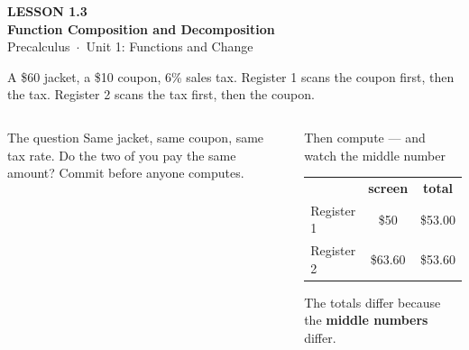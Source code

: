 \documentclass[aspectratio=169, 11pt]{beamer}
\begin{document}
{
\begin{frame}[plain]
  \vspace{2.8cm}\hspace{0.55cm}%
  \begin{minipage}{0.9\textwidth}
    {\color{goldacc}\bfseries\small LESSON 1.3}\\[0.5cm]
    {\color{white}\bfseries\LARGE Function Composition and Decomposition}\\[1.2cm]
    {\color{lilacmid}\small Precalculus~$\cdot$~Unit 1: Functions and Change}
  \end{minipage}
\end{frame}
}

\begin{frame}[t, plain]

  A \$60 jacket, a \$10 coupon, 6\% sales tax. Register 1 scans the coupon first,
  then the tax. Register 2 scans the tax first, then the coupon.

  \bigskip
  \begin{columns}[T, onlytextwidth]
      \begin{block}{The question}
        Same jacket, same coupon, same tax rate. Do the two of you pay the same
        amount? Commit before anyone computes.
      \end{block}

      \begin{block}{Then compute --- and watch the middle number}
        \begin{tabular}{@{}lcc@{}}
          & \textbf{screen} & \textbf{total} \\
          Register 1 & \$50 & \$53.00 \\
          Register 2 & \$63.60 & \$53.60 \\
        \end{tabular}

        \smallskip
        The totals differ because the \textbf{middle numbers} differ.
      \end{block}
  \end{columns}
\end{frame}
\end{document}
